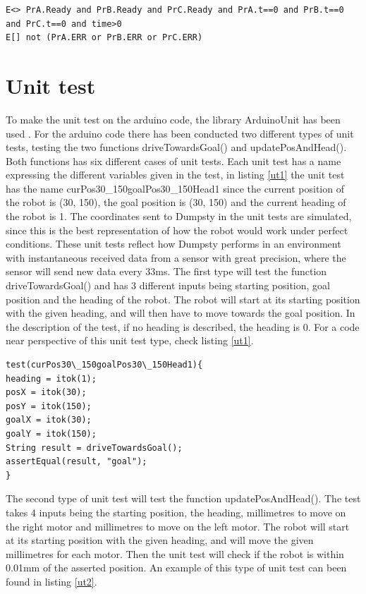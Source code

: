 \begin{lstlisting}[caption={Queries for UPPAAL}, label={Queries}]
E<> PrA.Ready and PrB.Ready and PrC.Ready and PrA.t==0 and PrB.t==0 and PrC.t==0 and time>0
E[] not (PrA.ERR or PrB.ERR or PrC.ERR)
\end{lstlisting}


\section{Unit test}
\label{sec:Unit test}
To make the unit test on the arduino code, the library ArduinoUnit has been used \citep{au}. For the arduino code there has been conducted two different types of unit tests, testing the two functions driveTowardsGoal() and updatePosAndHead(). Both functions has six different cases of unit tests. Each unit test has a name expressing the different variables given in the test, in listing \ref{ut1} the unit test has the name curPos30\_150goalPos30\_150Head1 since the current position of the robot is (30, 150), the goal position is (30, 150) and the current heading of the robot is 1. \newline
The coordinates sent to Dumpsty in the unit tests are simulated, since this is the best representation of how the robot would work under perfect conditions. These unit tests reflect how Dumpsty performs in an environment with instantaneous received data from a sensor with great precision, where the sensor will send new data every 33ms. 
The first type will test the function driveTowardsGoal() and has 3 different inputs being starting position, goal position and the heading of the robot. The robot will start at its starting position with the given heading, and will then have to move towards the goal position. In the description of the test, if no heading is described, the heading is 0. For a code near perspective of this unit test type, check listing \ref{ut1}.


\begin{lstlisting}[caption={First type of Unit test}, label={ut1}]
test(curPos30\_150goalPos30\_150Head1){
heading = itok(1);
posX = itok(30);
posY = itok(150);
goalX = itok(30);
goalY = itok(150);
String result = driveTowardsGoal();
assertEqual(result, "goal");
}
\end{lstlisting}


The second type of unit test will test the function updatePosAndHead(). The test takes 4 inputs being the starting position, the heading, millimetres to move on the right motor and millimetres to move on the left motor. The robot will start at its starting position with the given heading, and will move the given millimetres for each motor. Then the unit test will check if the robot is within 0.01mm of the asserted position. An example of this type of unit test can been found in listing \ref{ut2}.


